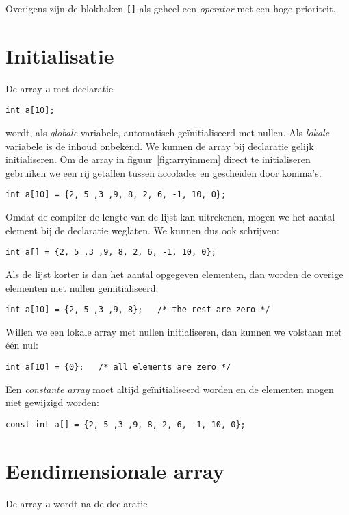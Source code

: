 Overigens zijn de blokhaken \texttt{[]} als geheel een \textsl{operator} met een hoge prioriteit.

\section{Initialisatie}
De array \texttt{a} met declaratie

\hspace*{1em}\texttt{int a[10];}

wordt, als \textsl{globale} variabele, automatisch geïnitialiseerd met nullen. Als \textsl{lokale} variabele is de inhoud onbekend.
We kunnen de array bij declaratie gelijk initialiseren. Om de array in figuur~\ref{fig:arryinmem} direct te initialiseren gebruiken we een rij getallen tussen accolades en gescheiden door komma's:

\hspace*{1em}\texttt{int a[10] = \{2, 5 ,3 ,9, 8, 2, 6, -1, 10, 0\};}

Omdat de compiler de lengte van de lijst kan uitrekenen, mogen we het aantal element bij de declaratie weglaten. We kunnen dus ook schrijven:

\hspace*{1em}\texttt{int a[] = \{2, 5 ,3 ,9, 8, 2, 6, -1, 10, 0\};}

Als de lijst korter is dan het aantal opgegeven elementen, dan worden de overige elementen met nullen geïnitialiseerd:

\hspace*{1em}\texttt{int a[10] = \{2, 5 ,3 ,9, 8\}; \ \ /* the rest are zero */} 

Willen we een lokale array met nullen initialiseren, dan kunnen we volstaan met één nul:

\hspace*{1em}\texttt{int a[10] = \{0\}; \ \ /* all elements are zero */} 

Een \textsl{constante array} moet altijd geïnitialiseerd worden en de elementen mogen niet gewijzigd worden:

\hspace*{1em}\texttt{const int a[] = \{2, 5 ,3 ,9, 8, 2, 6, -1, 10, 0\};}

\section{Eendimensionale array}
De array \texttt{a} wordt na de declaratie

